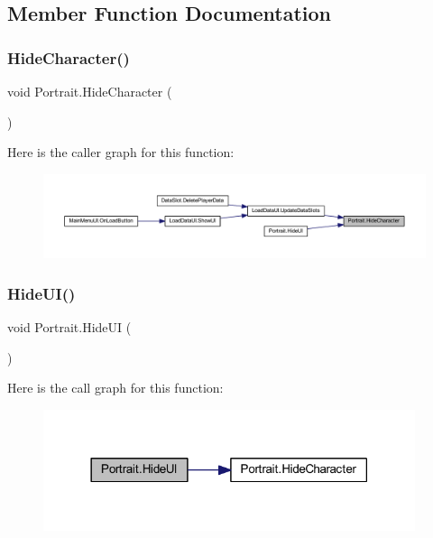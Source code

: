 \subsection{Member Function Documentation}
\mbox{\label{class_portrait_a3a0b6a4d3c9909127c51c4c4f4b152f5}} 
\subsubsection{\texorpdfstring{HideCharacter()}{HideCharacter()}}
{\footnotesize\ttfamily void Portrait.\+Hide\+Character (\begin{DoxyParamCaption}{ }\end{DoxyParamCaption})}

Here is the caller graph for this function\+:
\nopagebreak
\begin{figure}[H]
\begin{center}
\leavevmode
\includegraphics[width=350pt]{class_portrait_a3a0b6a4d3c9909127c51c4c4f4b152f5_icgraph}
\end{center}
\end{figure}
\mbox{\label{class_portrait_ac5ab4bb350640a35c516bffa2fc45fe3}} 
\subsubsection{\texorpdfstring{HideUI()}{HideUI()}}
{\footnotesize\ttfamily void Portrait.\+Hide\+UI (\begin{DoxyParamCaption}{ }\end{DoxyParamCaption})}

Here is the call graph for this function\+:
\nopagebreak
\begin{figure}[H]
\begin{center}
\leavevmode
\includegraphics[width=309pt]{class_portrait_ac5ab4bb350640a35c516bffa2fc45fe3_cgraph}
\end{center}
\end{figure}
\mbox{\label{class_portrait_a003483e7707bbb34e09ef3736e5b5b41}} 
